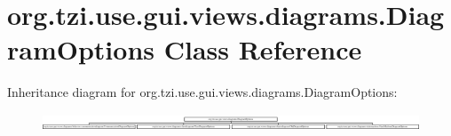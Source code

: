 \hypertarget{classorg_1_1tzi_1_1use_1_1gui_1_1views_1_1diagrams_1_1_diagram_options}{\section{org.\-tzi.\-use.\-gui.\-views.\-diagrams.\-Diagram\-Options Class Reference}
\label{classorg_1_1tzi_1_1use_1_1gui_1_1views_1_1diagrams_1_1_diagram_options}
}
Inheritance diagram for org.\-tzi.\-use.\-gui.\-views.\-diagrams.\-Diagram\-Options\-:\begin{figure}[H]
\begin{center}
\leavevmode
\includegraphics[height=0.503597cm]{classorg_1_1tzi_1_1use_1_1gui_1_1views_1_1diagrams_1_1_diagram_options}
\end{center}
\end{figure}
